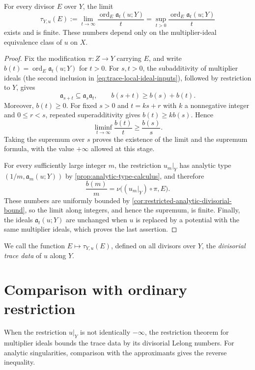 \begin{theorem}\label{thm:intrinsic-trace-profile}
For every divisor $E$ over $Y$, the limit
\begin{equation}\label{eq:trace-profile}
 \tau_{Y,u}(E)
 :=\lim_{t\to\infty}\frac{\operatorname{ord}_E\mathfrak a_t(u;Y)}{t}
 =\sup_{t>0}\frac{\operatorname{ord}_E\mathfrak a_t(u;Y)}{t}
\end{equation}
exists and is finite. These numbers depend only on the multiplier-ideal equivalence class of $u$ on $X$.
\end{theorem}
\begin{proof}
Fix the modification $\pi\colon Z\to Y$ carrying $E$, and write $b(t)=\operatorname{ord}_E\mathfrak a_t(u;Y)$ for $t>0$. For $s,t>0$, the subadditivity of multiplier ideals (the second inclusion in \eqref{eq:trace-local-ideal-inputs}), followed by restriction to $Y$, gives
\[
 \mathfrak a_{s+t}\subseteq\mathfrak a_s\mathfrak a_t,
 \qquad b(s+t)\geq b(s)+b(t).
\]
Moreover, $b(t)\geq0$. For fixed $s>0$ and $t=ks+r$ with $k$ a nonnegative integer and $0\leq r<s$, repeated superadditivity gives $b(t)\geq k b(s)$. Hence
\[
 \liminf_{t\to\infty}\frac{b(t)}t\geq\frac{b(s)}s.
\]
Taking the supremum over $s$ proves the existence of the limit and the supremum formula, with the value $+\infty$ allowed at this stage.

For every sufficiently large integer $m$, the restriction $u_m|_Y$ has analytic type $(1/m,\mathfrak a_m(u;Y))$ by \cref{prop:analytic-type-calculus}, and therefore
\[
 \frac{b(m)}m
 =\nu\bigl((u_m|_Y)\circ\pi,E\bigr).
\]
These numbers are uniformly bounded by \cref{cor:restricted-analytic-divisorial-bound}, so the limit along integers, and hence the supremum, is finite. Finally, the ideals $\mathfrak a_t(u;Y)$ are unchanged when $u$ is replaced by a potential with the same multiplier ideals, which proves the last assertion.
\end{proof}

We call the function $E\mapsto\tau_{Y,u}(E)$, defined on all divisors over $Y$, the \emph{divisorial trace data} of $u$ along $Y$.



\section{Comparison with ordinary restriction}

When the restriction $u|_Y$ is not identically $-\infty$, the restriction theorem for multiplier ideals bounds the trace data by its divisorial Lelong numbers. For analytic singularities, comparison with the approximants gives the reverse inequality.

